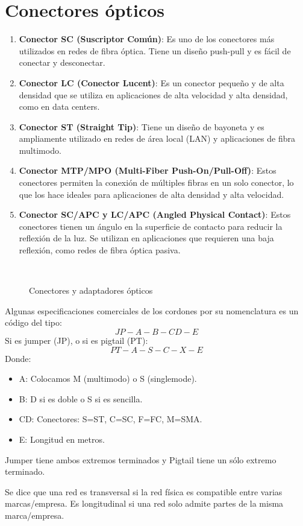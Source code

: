 \documentclass[
	12pt, %
	fleqn, %
	a4paper, %
	oneside, %
]{LegrandOrangeBook}
\begin{document}
\section{Conectores ópticos}
\begin{enumerate}
\item \textbf{Conector SC (Suscriptor Común)}: Es uno de los conectores más utilizados en redes de fibra óptica. Tiene un diseño push-pull y es fácil de conectar y desconectar.

\item \textbf{Conector LC (Conector Lucent)}: Es un conector pequeño y de alta densidad que se utiliza en aplicaciones de alta velocidad y alta densidad, como en data centers.

\item \textbf{Conector ST (Straight Tip)}: Tiene un diseño de bayoneta y es ampliamente utilizado en redes de área local (LAN) y aplicaciones de fibra multimodo.

\item \textbf{Conector MTP/MPO (Multi-Fiber Push-On/Pull-Off)}: Estos conectores permiten la conexión de múltiples fibras en un solo conector, lo que los hace ideales para aplicaciones de alta densidad y alta velocidad.

\item \textbf{Conector SC/APC y LC/APC (Angled Physical Contact)}: Estos conectores tienen un ángulo en la superficie de contacto para reducir la reflexión de la luz. Se utilizan en aplicaciones que requieren una baja reflexión, como redes de fibra óptica pasiva.
\end{enumerate}
\begin{figure}[H]
\centering
{}\\
\caption{Conectores y adaptadores ópticos}
\end{figure}
Algunas especificaciones comerciales de los cordones por su nomenclatura es un código del tipo:
\begin{displaymath}
JP-A-B-CD-E
\end{displaymath}
Si es jumper (JP), o si es pigtail (PT):
\begin{displaymath}
PT-A-S-C-X-E
\end{displaymath}
Donde:
\begin{itemize}
\item A: Colocamos M (multimodo) o S (singlemode).
\item B: D si es doble o S si es sencilla.
\item CD: Conectores: S=ST, C=SC, F=FC, M=SMA.
\item E: Longitud en metros.
\end{itemize}
\begin{remark}
Jumper tiene ambos extremos terminados y Pigtail tiene un sólo extremo terminado.
\end{remark}
\begin{notation}
Se dice que una red es transversal si la red física es compatible entre varias marcas/empresa. Es longitudinal si una red solo admite partes de la misma marca/empresa.
\end{notation}
\end{document}
